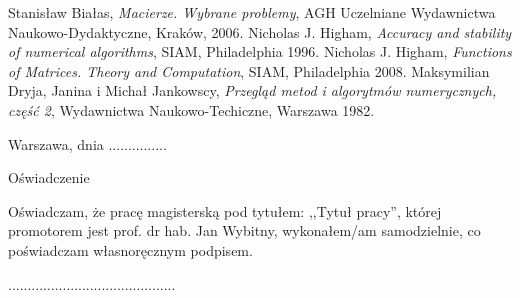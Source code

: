 \documentclass[12pt, twoside, openany]{report}
\theoremstyle{definition}
\begin{document}
\begin{thebibliography}{11}
 Stanisław Białas, \emph{Macierze. Wybrane problemy}, AGH Uczelniane Wydawnictwa Naukowo-Dydaktyczne, Kraków, 2006.
 Nicholas J. Higham, \emph{Accuracy and stability of numerical algorithms}, SIAM, Philadelphia 1996.
 Nicholas J. Higham, \emph{Functions of Matrices. Theory and Computation}, SIAM, Philadelphia 2008.
 Maksymilian Dryja, Janina i Michał Jankowscy, \emph{Przegląd metod i algorytmów numerycznych, część 2}, Wydawnictwa Naukowo-Techiczne, Warszawa 1982.
\end{thebibliography}
\tableofcontents
\clearpage
\begin{otherlanguage}{polish}
\pagestyle{empty}
\noindent Warszawa, dnia ...............
\vspace{5cm}
\begin{center}
\LARGE{Oświadczenie}
\end{center}
Oświadczam, że pracę magisterską pod tytułem: ,,Tytuł pracy'', której promotorem jest prof. dr hab. Jan Wybitny, wykonałem/am samodzielnie, co poświadczam własnoręcznym podpisem.
\vspace{2cm}
\begin{flushright}
...........................................
\end{flushright}
\end{otherlanguage}
\end{document}
